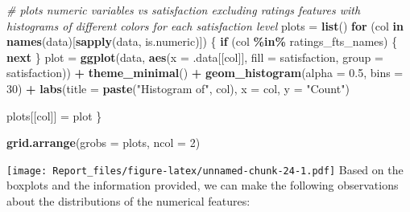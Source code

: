 \documentclass[
]{article}
\newenvironment{Shaded}{\begin{snugshade}}{\end{snugshade}}
\newcommand{\AttributeTok}[1]{\textcolor[rgb]{0.13,0.29,0.53}{#1}}
\newcommand{\CommentTok}[1]{\textcolor[rgb]{0.56,0.35,0.01}{\textit{#1}}}
\newcommand{\ControlFlowTok}[1]{\textcolor[rgb]{0.13,0.29,0.53}{\textbf{#1}}}
\newcommand{\DecValTok}[1]{\textcolor[rgb]{0.00,0.00,0.81}{#1}}
\newcommand{\FloatTok}[1]{\textcolor[rgb]{0.00,0.00,0.81}{#1}}
\newcommand{\FunctionTok}[1]{\textcolor[rgb]{0.13,0.29,0.53}{\textbf{#1}}}
\newcommand{\NormalTok}[1]{#1}
\newcommand{\OtherTok}[1]{\textcolor[rgb]{0.56,0.35,0.01}{#1}}
\newcommand{\SpecialCharTok}[1]{\textcolor[rgb]{0.81,0.36,0.00}{\textbf{#1}}}
\newcommand{\StringTok}[1]{\textcolor[rgb]{0.31,0.60,0.02}{#1}}
\begin{document}
\begin{Shaded}
\begin{Highlighting}[]
\CommentTok{\# plots numeric variables vs satisfaction excluding ratings features with histograms of different colors for each satisfaction level}
\NormalTok{plots }\OtherTok{=} \FunctionTok{list}\NormalTok{()}
\ControlFlowTok{for}\NormalTok{ (col }\ControlFlowTok{in} \FunctionTok{names}\NormalTok{(data)[}\FunctionTok{sapply}\NormalTok{(data, is.numeric)]) \{}
  \ControlFlowTok{if}\NormalTok{ (col }\SpecialCharTok{\%in\%}\NormalTok{ ratings\_fts\_names) \{}
    \ControlFlowTok{next}
\NormalTok{  \}}
\NormalTok{  plot }\OtherTok{=} \FunctionTok{ggplot}\NormalTok{(data, }\FunctionTok{aes}\NormalTok{(}\AttributeTok{x =}\NormalTok{ .data[[col]], }\AttributeTok{fill =}\NormalTok{ satisfaction, }\AttributeTok{group =}\NormalTok{ satisfaction)) }\SpecialCharTok{+}
    \FunctionTok{theme\_minimal}\NormalTok{() }\SpecialCharTok{+}
    \FunctionTok{geom\_histogram}\NormalTok{(}\AttributeTok{alpha =} \FloatTok{0.5}\NormalTok{, }\AttributeTok{bins =} \DecValTok{30}\NormalTok{) }\SpecialCharTok{+}
    \FunctionTok{labs}\NormalTok{(}\AttributeTok{title =} \FunctionTok{paste}\NormalTok{(}\StringTok{"Histogram of"}\NormalTok{, col), }\AttributeTok{x =}\NormalTok{ col, }\AttributeTok{y =} \StringTok{"Count"}\NormalTok{) }

\NormalTok{  plots[[col]] }\OtherTok{=}\NormalTok{ plot}
\NormalTok{\}}

\FunctionTok{grid.arrange}\NormalTok{(}\AttributeTok{grobs =}\NormalTok{ plots, }\AttributeTok{ncol =} \DecValTok{2}\NormalTok{)}
\end{Highlighting}
\end{Shaded}

\texttt{[image: Report\_files/figure-latex/unnamed-chunk-24-1.pdf]} Based
on the boxplots and the information provided, we can make the following
observations about the distributions of the numerical features:
\end{document}
